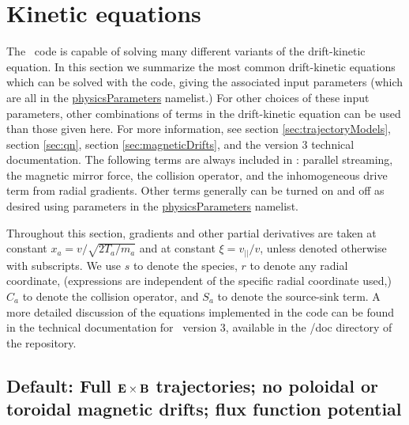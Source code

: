 \chapter{Kinetic equations}

The \sfincs~code is capable of solving many different variants of the drift-kinetic equation.
In this section we summarize the most common drift-kinetic equations
which can be solved with the code, giving the associated input parameters
(which are all in the  {\ttfamily \hyperref[sec:physicsParameters]{physicsParameters}} namelist.)
For other choices of these input parameters, 
other combinations of terms in the drift-kinetic equation can be used than those
given here.
For more information, see section \ref{sec:trajectoryModels}, section \ref{sec:qn}, section \ref{sec:magneticDrifts},
and the version 3 technical documentation.
The following terms are always included in \sfincs:
parallel streaming, the magnetic mirror force, the collision operator,
and the inhomogeneous drive term from radial gradients.
Other terms generally can be turned on and off as desired using parameters in the
{\ttfamily \hyperref[sec:physicsParameters]{physicsParameters}} namelist.

Throughout this section, gradients and other partial derivatives are taken
at constant $x_a = v/\sqrt{2T_a/m_a}$ and at constant $\xi = v_{||} / v$, unless denoted otherwise with subscripts.
We use $s$ to denote the species, $r$ to denote any radial coordinate, (expressions are independent
of the specific radial coordinate used,)
$C_a$ to denote the collision operator, and $S_a$ to denote the source-sink term.
A more detailed discussion of the equations implemented in the code can be found
in the technical documentation for \sfincs~version 3, available in the {\ttfamily /doc} directory
of the repository.

\section{Default: Full ${\mathbf E}\times{\mathbf B}$ trajectories; no poloidal or toroidal magnetic drifts; flux function potential}

